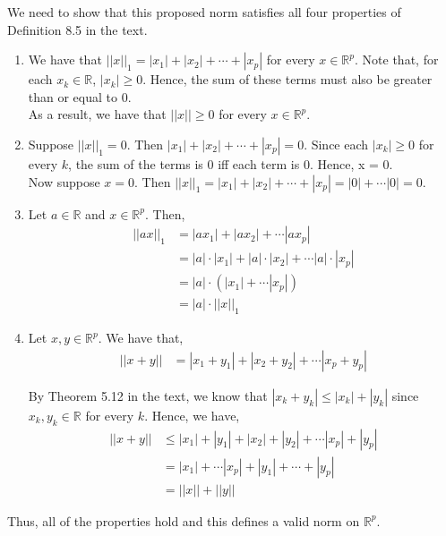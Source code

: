 \documentclass[12pt]{article}
\begin{document}
We need to show that this proposed norm satisfies all four properties of Definition 8.5 in the text.

\begin{enumerate}

\item We have that $||x||_1 = |x_1| + |x_2| + \cdots + |x_p|$ for every $x \in \mathbb{R}^p$. Note that, for each $x_k \in \mathbb{R}$, $|x_k| \geq 0$. Hence, the sum of these terms must also be greater than or equal to $0$.\\

As a result, we have that $||x|| \geq 0$ for every $x \in \mathbb{R}^p$.

\item Suppose $||x||_1 = 0$. Then $|x_1| + |x_2| + \cdots + |x_p| = 0$. Since each $|x_k| \geq 0$ for every $k$, the sum of the terms is $0$ iff each term is $0$. Hence, x = 0.\\

Now suppose $x = 0$. Then $||x||_1 = |x_1| + |x_2| + \cdots + |x_p| = |0| + \cdots |0| = 0$.

\item Let $a \in \mathbb{R}$ and $x \in \mathbb{R}^p$. Then,
\begin{align*}
||ax||_1 &= |ax_1| + |ax_2| + \cdots |ax_p|\\
&= |a| \cdot |x_1| + |a| \cdot |x_2| + \cdots |a| \cdot |x_p| \\
&= |a| \cdot (|x_1| + \cdots |x_p|)\\
&= |a| \cdot ||x||_1
\end{align*}

\item Let $x, y \in \mathbb{R}^p$. We have that,
\begin{align*}
||x + y|| &= |x_1 + y_1| + |x_2 + y_2| + \cdots |x_p + y_p|
\end{align*}

By Theorem 5.12 in the text, we know that $|x_k + y_k| \leq |x_k| + |y_k|$ since $x_k, y_k \in \mathbb{R}$ for every $k$. Hence, we have,
\begin{align*}
||x + y|| &\leq |x_1| + |y_1| + |x_2| + |y_2| + \cdots |x_p| + |y_p|\\
&= |x_1| + \cdots |x_p| + |y_1| + \cdots + |y_p|\\
&= ||x|| + ||y||
\end{align*}
\end{enumerate}

Thus, all of the properties hold and this defines a valid norm on $\mathbb{R}^p$.
\end{document}
